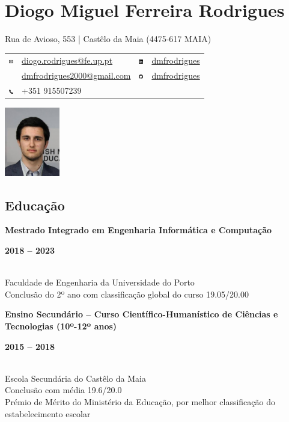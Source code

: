 \documentclass[8pt]{extarticle}
\newcommand{\parag}[1]{
\begin{minipage}{\textwidth} \hfill
\begin{minipage}{\dimexpr\textwidth-0.6cm}
	#1
\end{minipage}
\end{minipage}
}
\newcommand{\itemtime}[2]{
#1 \hfill \begin{minipage}[t]{0.185\textwidth}         #2  \end{minipage}
}
\newcommand{\job}[3]{\parag{
\itemtime{\textbf{#1}}{\textbf{#2}}\\
#3 \vspace*{9px}}}
\begin{document}
\thispagestyle{empty}
\noindent
\begin{minipage}[l]{0.75\textwidth}
	\section*{Diogo Miguel Ferreira Rodrigues}
	Rua de Avioso, 553 | Castêlo da Maia (4475-617 MAIA)\\
    \begin{tabular}{@{}c @{\hskip 0.5em} l @{\hskip 5em} c @{\hskip 0.5em} l @{}}
        \includegraphics[height=7px]{email.png}    & \href{mailto:diogo.rodrigues@fe.up.pt}{diogo.rodrigues@fe.up.pt}     & \includegraphics[height=7px]{linkedin.png} & \href{https://www.linkedin.com/in/dmfrodrigues/}{dmfrodrigues} \\
                                                   & \href{mailto:dmfrodrigues2000@gmail.com}{dmfrodrigues2000@gmail.com} & \includegraphics[height=7px]{github.png}   & \href{https://github.com/dmfrodrigues}{dmfrodrigues}\\
        \includegraphics[height=7px]{phone.png}    & +351 915507239 \\
    \end{tabular}
\end{minipage}%
\begin{minipage}[l]{0.24\textwidth}
	\begin{center} \includegraphics[height=30mm]{cv_photo.jpg} \end{center}
\end{minipage}
\subsection*{Educação}
\job{Mestrado Integrado em Engenharia Informática e Computação}{2018 – 2023}{
Faculdade de Engenharia da Universidade do Porto\\
Conclusão do 2º ano com classificação global do curso 19.05/20.00
}
\job{Ensino Secundário – Curso Científico-Humanístico de Ciências e Tecnologias (10º-12º anos)}{2015 – 2018}{
Escola Secundária do Castêlo da Maia\\
Conclusão com média 19.6/20.0\\
Prémio de Mérito do Ministério da Educação, por melhor classificação do estabelecimento escolar
}
\end{document}
